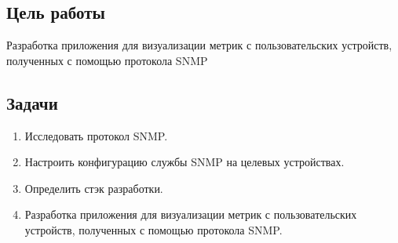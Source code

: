 \subsection*{Цель работы}

Разработка приложения для визуализации метрик
с пользовательских устройств, полученных с помощью протокола SNMP

\subsection*{Задачи}

\begin{enumerate}
    \item Исследовать протокол SNMP.
    \item Настроить конфигурацию службы SNMP на целевых устройствах.
    \item Определить стэк разработки.
    \item Разработка приложения для визуализации метрик
    с пользовательских устройств, полученных с помощью протокола SNMP.
\end{enumerate}